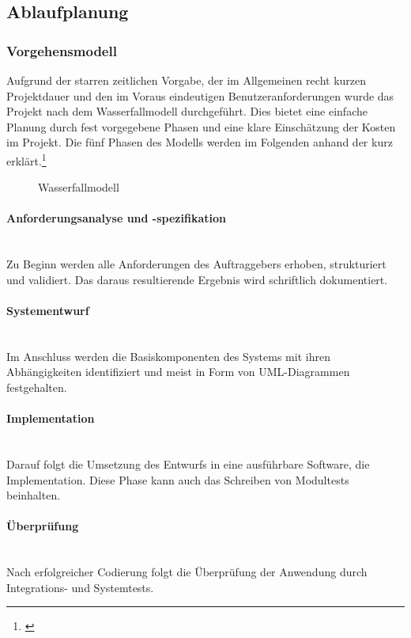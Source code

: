 \subsection{Ablaufplanung}
\label{sec:Ablaufplanung}

\subsubsection{Vorgehensmodell}
\label{sec:Vorgehensmodell}
Aufgrund der starren zeitlichen Vorgabe, der im Allgemeinen recht kurzen Projektdauer und den im Voraus eindeutigen Benutzeranforderungen wurde das Projekt nach dem Wasserfallmodell durchgeführt. Dies bietet eine einfache Planung durch fest vorgegebene Phasen und eine klare Einschätzung der Kosten im Projekt. Die fünf Phasen des Modells werden im Folgenden anhand der  kurz erklärt.\footnote{\cite{wiki:waterfall}} 
\begin{figure}[htb]
	\centering
	\caption{Wasserfallmodell}
	\label{fig:Waterfall}
\end{figure}

\paragraph{Anforderungsanalyse und -spezifikation} ~\\
\label{p:Anforderungsanalyse}
Zu Beginn werden alle Anforderungen des Auftraggebers erhoben, strukturiert und validiert. Das daraus resultierende Ergebnis wird schriftlich dokumentiert.

\paragraph{Systementwurf} ~\\
\label{p:Systementwurf}
Im Anschluss werden die Basiskomponenten des Systems mit ihren Abhängigkeiten identifiziert und meist in Form von UML-Diagrammen festgehalten.

\paragraph{Implementation} ~\\
\label{p:Implementation}
Darauf folgt die Umsetzung des Entwurfs in eine ausführbare Software, die Implementation. Diese Phase kann auch das Schreiben von Modultests beinhalten.

\paragraph{Überprüfung} ~\\
\label{p:Ueberpruefung}
Nach erfolgreicher Codierung folgt die Überprüfung der Anwendung durch Integrations- und Systemtests.

